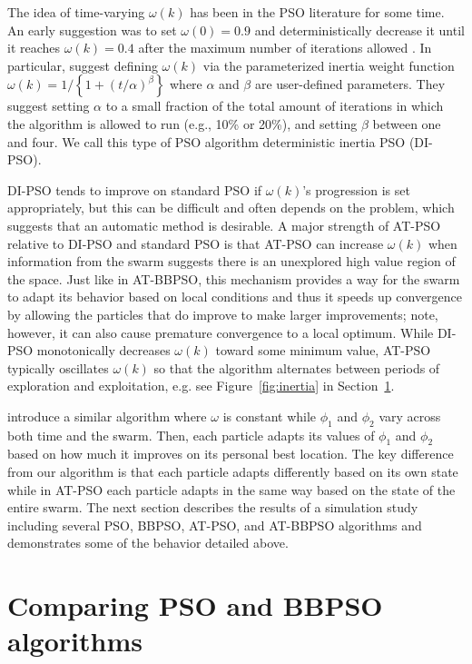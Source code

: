 \documentclass[cmbright]{staauth}
\begin{document}
The idea of time-varying $\omega(k)$ has been in the PSO literature for some time. An early suggestion was to set $\omega(0)=0.9$ and deterministically decrease it until it reaches $\omega(k)=0.4$ after the maximum number of iterations allowed \citep{eberhart2000comparing}. In particular, \cite{tuppadung2011comparing} suggest defining $\omega(k)$ via the parameterized inertia weight function $\omega(k) = 1/\left\{1 + (t/\alpha)^{\beta}\right\}$ where $\alpha$ and $\beta$ are user-defined parameters. They suggest setting $\alpha$ to a small fraction of the total amount of iterations in which the algorithm is allowed to run (e.g., 10\% or 20\%), and setting $\beta$ between one and four. We call this type of PSO algorithm deterministic inertia PSO (DI-PSO).

DI-PSO tends to improve on standard PSO if $\omega(k)$'s progression is set appropriately, but this can be difficult and often depends on the problem, which suggests that an automatic method is desirable. A major strength of AT-PSO relative to DI-PSO and standard PSO is that AT-PSO can increase $\omega(k)$ when information from the swarm suggests there is an unexplored high value region of the space. Just like in AT-BBPSO, this mechanism provides a way for the swarm to adapt its behavior based on local conditions and thus it speeds up convergence by allowing the particles that do improve to make larger improvements; note, however, it can also cause premature convergence to a local optimum. While DI-PSO monotonically decreases $\omega(k)$ toward some minimum value, AT-PSO typically oscillates $\omega(k)$ so that the algorithm alternates between periods of exploration and exploitation, e.g. see Figure~\ref{fig:inertia} in Section~\ref{sec:psocompare}.

\cite{zhang2003adaptive} introduce a similar algorithm where $\omega$ is constant while $\phi_1$ and $\phi_2$ vary across both time and the swarm. Then, each particle adapts its values of $\phi_1$ and $\phi_2$ based on how much it improves on its personal best location. The key difference from our algorithm is that each particle adapts differently based on its own state while in AT-PSO each particle adapts in the same way based on the state of the entire swarm. The next section describes the results of a simulation study including several PSO, BBPSO, AT-PSO, and AT-BBPSO algorithms and demonstrates some of the behavior detailed above.


\section{Comparing PSO and BBPSO algorithms}\label{sec:psocompare}
\end{document}
